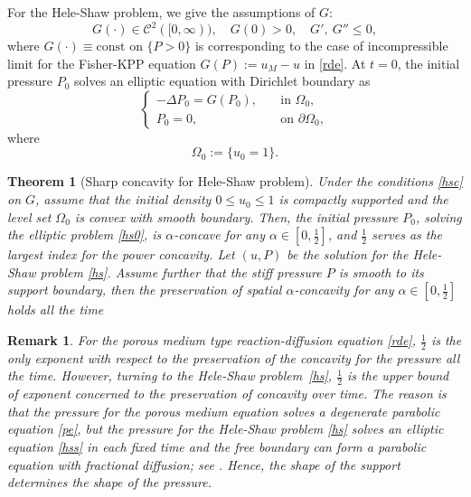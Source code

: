 \documentclass[10pt]{article}         %
\newtheorem{theorem}{Theorem}[section]
\newtheorem{remark}{Remark}[section]
\numberwithin{equation}{section}
\begin{document}
For the Hele-Shaw problem, we give the assumptions of $G$:
\begin{equation}\label{hsc}
G(\cdot)\in\mathcal{C}^2([0,\infty)),\quad G(0)>0,\quad G',\ G''\leq 0, 
\end{equation}
where $G(\cdot)\equiv\text{const}$ on $\{P>0\}$ is corresponding to the case of incompressible limit for the Fisher-KPP equation $G(P):=u_M-u$ in \eqref{rde}. %
At $t=0$, the initial pressure $P_0$ solves an elliptic equation with Dirichlet boundary as
\begin{equation}\label{hs0}
\begin{cases}
-\Delta P_0=G(P_0),\quad &\text{in }\Omega_0,\\
P_0=0,\quad&\text{on }\partial\Omega_0,
\end{cases}
\end{equation}
where 
\[\Omega_0:=\{u_0=1\}.\]



\begin{theorem}[Sharp concavity for Hele-Shaw problem]\label{schsp} Under the conditions \eqref{hsc} on $G$, assume that the initial density $0\leq u_0\leq 1$ is compactly supported and the level set $\Omega_0$  is convex with smooth boundary. Then, the initial pressure $P_0$, solving the elliptic problem \eqref{hs0}, is $\alpha$-concave for any  $\alpha\in[0,\frac{1}{2}]$, and $\frac{1}{2}$ serves as the largest index for the power concavity. Let $(u,P)$ be the solution for the Hele-Shaw problem \eqref{hs}.  Assume further that the stiff pressure $P$ is smooth to its support boundary, then the preservation of spatial $\alpha$-concavity for any $\alpha\in[0,\frac{1}{2}]$ holds all the time
\end{theorem}
\begin{remark}
    For the porous medium type reaction-diffusion  equation \eqref{rde}, $\frac{1}{2}$ is the only exponent with respect to the preservation of the concavity for the pressure all the time. However, turning to the Hele-Shaw problem~\eqref{hs}, $\frac{1}{2}$ is the upper bound of exponent concerned to the preservation of concavity over time. The reason is that the pressure for the porous medium equation solves a degenerate parabolic equation \eqref{pe}, but the pressure for the Hele-Shaw problem \eqref{hs} solves an elliptic equation \eqref{hss} in each fixed time and the free boundary can form a parabolic equation with fractional diffusion; see \cite{KT2021}. Hence, the shape of the support determines the shape of the pressure.

   
\end{remark}
\end{document}
